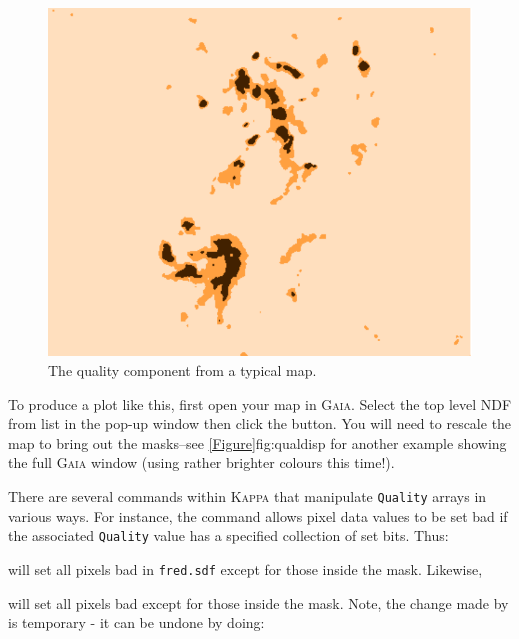 \begin{figure}[t!]
\includegraphics[width=0.6\linewidth]{sc21_qual}
\caption[Quality component displayed as an image]{The quality component
from a typical map.}
\label{fig:qualmap}
\end{figure}

To produce a plot like this, first open your map in \textsc{Gaia}. Select
the top level NDF from list in the pop-up window then click the
 button. You will need to rescale the map to bring
out the masks--see \cref{Figure}{fig:qualdisp}{} for another example
showing the full \textsc{Gaia} window (using rather brighter colours this
time!).


There are several commands within \textsc{Kappa} that manipulate
\texttt{Quality} arrays in various ways. For instance, the
 command allows pixel data values to
be set bad if the associated \texttt{Quality} value has a specified
collection of set bits. Thus:

\begin{terminalv}
\end{terminalv}

will set all pixels bad in \texttt{fred.sdf} except for those inside the
 mask. Likewise,

\begin{terminalv}
\end{terminalv}

will set all pixels bad except for those inside the  mask.  Note, the
change made by  is temporary - it can be undone by doing:

